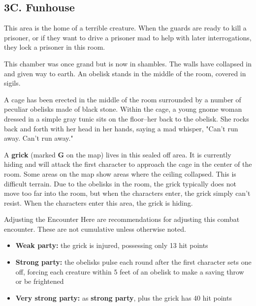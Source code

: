 \documentclass[10pt,a4paper,twoside,bg=print,twocolumn,openany,nodeprecatedcode]{dndbook}
\begin{document}
\subsection{3C. Funhouse}
This area is the home of a terrible creature. When the guards are ready to kill a prisoner, or if they want to drive a prisoner mad to help with later interrogations, they lock a prisoner in this room.

\begin{DndReadAloud}{}
This chamber was once grand but is now in shambles. The walls have collapsed in and given way to earth. An obelisk stands in the middle of the room, covered in sigils.

A cage has been erected in the middle of the room surrounded by a number of peculiar obelisks made of black stone. Within the cage, a young gnome woman dressed in a simple gray tunic sits on the floor--her back to the obelisk. She rocks back and forth with her head in her hands, saying a mad whisper, "Can't run away. Can't run away."

\end{DndReadAloud}

A \textbf{grick} (marked \textbf{G} on the map) lives in this sealed off area. It is currently hiding and will attack the first character to approach the cage in the center of the room. Some areas on the map show areas where the ceiling collapsed. This is difficult terrain. Due to the obelisks in the room, the grick typically does not move too far into the room, but when the characters enter, the grick simply can't resist. When the characters enter this area, the grick is hiding.

\begin{DndSidebar}[float=!b]{Adjusting the Encounter}
Here are recommendations for adjusting this combat encounter. These are not cumulative unless otherwise noted.




\begin{itemize}
\item \textbf{Weak party:} the grick is injured, possessing only 13 hit points
\item \textbf{Strong party:} the obelisks pulse each round after the first character sets one off, forcing each creature within 5 feet of an obelisk to make a saving throw or be frightened
\item \textbf{Very strong party:} as \textbf{strong party}, plus the grick has 40 hit points
\end{itemize}



\end{DndSidebar}
\end{document}
